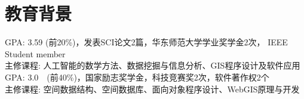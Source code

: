 \documentclass{resume}
\begin{document}




\section{教育背景}
{\small GPA: 3.59 (前20\%)，发表SCI论文2篇，华东师范大学学业奖学金2次， IEEE Student member\\
  主修课程: 人工智能的数学方法、数据挖掘与信息分析、GIS程序设计及软件应用}
\vspace{0.1cm}
{\small GPA: 3.0~~(前40\%)，国家励志奖学金，科技竞赛奖2次，软件著作权2个\\
  主修课程: 空间数据结构、空间数据库、面向对象程序设计、WebGIS原理与开发}

\end{document}
